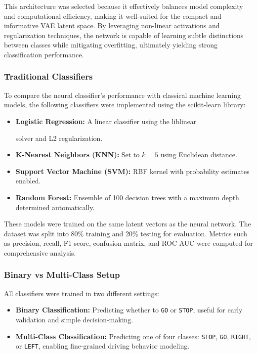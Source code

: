 This architecture was selected because it effectively balances model complexity and computational efficiency, making it well-suited for the compact and informative VAE latent space. By leveraging non-linear activations and regularization techniques, the network is capable of learning subtle distinctions between classes while mitigating overfitting, ultimately yielding strong classification performance.



\subsubsection*{Traditional Classifiers}

To compare the neural classifier's performance with classical machine learning models, the following classifiers were implemented using the scikit-learn library:

\begin{itemize}
    \item \textbf{Logistic Regression:} A linear classifier using the liblinear
    
    
    solver and L2 regularization.
    \item \textbf{K-Nearest Neighbors (KNN):} Set to $k=5$ using Euclidean distance.
    \item \textbf{Support Vector Machine (SVM):} RBF kernel with probability estimates enabled.
    \item \textbf{Random Forest:} Ensemble of 100 decision trees with a maximum depth determined automatically.
\end{itemize}

These models were trained on the same latent vectors as the neural network. The dataset was split into 80\% training and 20\% testing for evaluation. Metrics such as precision, recall, F1-score, confusion matrix, and ROC-AUC were computed for comprehensive analysis.

\subsubsection*{Binary vs Multi-Class Setup}

All classifiers were trained in two different settings:
\begin{itemize}
    \item \textbf{Binary Classification:} Predicting whether to \texttt{GO} or \texttt{STOP}, useful for early validation and simple decision-making.
    \item \textbf{Multi-Class Classification:} Predicting one of four classes: \texttt{STOP}, \texttt{GO}, \texttt{RIGHT}, or \texttt{LEFT}, enabling fine-grained driving behavior modeling.
\end{itemize}

